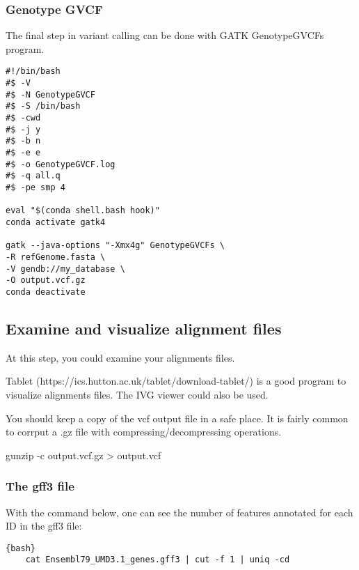 \subsubsection{Genotype GVCF}

The final step in variant calling can be done with GATK GenotypeGVCFs program.

\begin{verbatim}
#!/bin/bash
#$ -V
#$ -N GenotypeGVCF
#$ -S /bin/bash
#$ -cwd
#$ -j y
#$ -b n
#$ -e e
#$ -o GenotypeGVCF.log
#$ -q all.q
#$ -pe smp 4

eval "$(conda shell.bash hook)"
conda activate gatk4

gatk --java-options "-Xmx4g" GenotypeGVCFs \
-R refGenome.fasta \
-V gendb://my_database \
-O output.vcf.gz
conda deactivate
\end{verbatim}






\subsection{Examine and visualize alignment files}

At this step, you could examine your alignments files.

Tablet (https://ics.hutton.ac.uk/tablet/download-tablet/) is a good program to visualize alignments files. The IVG viewer could also be used.


You should keep a copy of the vcf output file in a safe place. It is fairly common to corrput a .gz file with compressing/decompressing operations.





gunzip -c output.vcf.gz > output.vcf






\subsubsection{The gff3 file}

With the command below, one can see the number of features annotated for each ID in the gff3 file: 

\begin{verbatim}{bash}
	cat Ensembl79_UMD3.1_genes.gff3 | cut -f 1 | uniq -cd
\end{verbatim}



